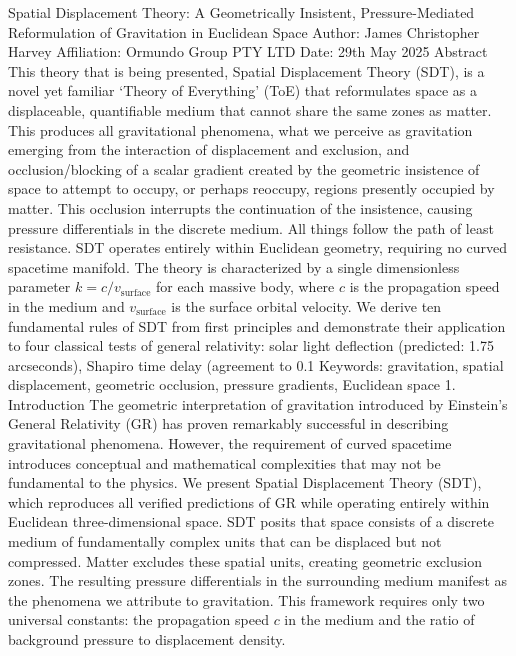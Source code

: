 Spatial Displacement Theory: A Geometrically Insistent, Pressure-Mediated Reformulation of Gravitation in Euclidean Space
Author: James Christopher Harvey 
Affiliation: Ormundo Group PTY LTD
Date: 29th May 2025
Abstract
This theory that is being presented, Spatial Displacement Theory (SDT), is a novel yet familiar ‘Theory of Everything’ (ToE) that reformulates space as a displaceable, quantifiable medium that cannot share the same zones as matter. This produces all gravitational phenomena, what we perceive as gravitation emerging from the interaction of displacement and exclusion, and occlusion/blocking of a scalar gradient created by the geometric insistence of space to attempt to occupy, or perhaps reoccupy, regions presently occupied by matter. This occlusion interrupts the continuation of the insistence, causing pressure differentials in the discrete medium. All things follow the path of least resistance.  SDT operates entirely within Euclidean geometry, requiring no curved spacetime manifold. The theory is characterized by a single dimensionless parameter $k = c/v_{\text{surface}}$ for each massive body, where $c$ is the propagation speed in the medium and $v_{\text{surface}}$ is the surface orbital velocity. We derive ten fundamental rules of SDT from first principles and demonstrate their application to four classical tests of general relativity: solar light deflection (predicted: 1.75 arcseconds), Shapiro time delay (agreement to 0.1%
Keywords: gravitation, spatial displacement, geometric occlusion, pressure gradients, Euclidean space
1. Introduction
The geometric interpretation of gravitation introduced by Einstein's General Relativity (GR) has proven remarkably successful in describing gravitational phenomena. However, the requirement of curved spacetime introduces conceptual and mathematical complexities that may not be fundamental to the physics. We present Spatial Displacement Theory (SDT), which reproduces all verified predictions of GR while operating entirely within Euclidean three-dimensional space.
SDT posits that space consists of a discrete medium of fundamentally complex units that can be displaced but not compressed. Matter excludes these spatial units, creating geometric exclusion zones. The resulting pressure differentials in the surrounding medium manifest as the phenomena we attribute to gravitation. This framework requires only two universal constants: the propagation speed $c$ in the medium and the ratio of background pressure to displacement density.
